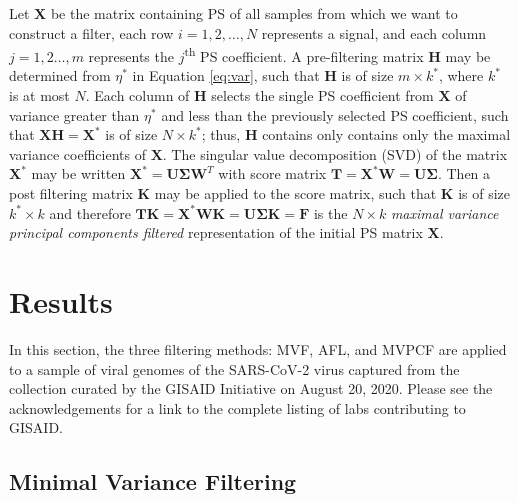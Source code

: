 \documentclass[10pt,conference]{IEEEtran}
\begin{document}
Let $\pmb{X}$ be the matrix containing PS of all samples from which we want to construct a filter, each row $i=1,2,\dots,N$ represents a signal, and each column $j=1,2\dots,m$ represents the $j$\textsuperscript{th} PS coefficient.  
A pre-filtering matrix $\pmb{H}$ may be determined from $\eta^*$ in Equation \ref{eq:var}, such that $\pmb{H}$ is of size $m \times k^*$, where $k^*$ is at most $N$. Each column of $\pmb{H}$ selects the single PS coefficient from $\pmb{X}$ of variance greater than $\eta^*$ and less than the previously selected PS coefficient, such that $\pmb{X}\pmb{H} = \pmb{X^*}$ is of size $N \times k^*$; thus, $\pmb{H}$ contains only contains only the maximal variance coefficients of $\pmb{X}$.  The singular value decomposition (SVD) of the matrix $\pmb{X^*}$ may be written $\pmb{X^*} = \pmb{U}\pmb{\Sigma}\pmb{W}^T$ with score matrix $\pmb{T} =\pmb{X^*}\pmb{W} = \pmb{U}\pmb{\Sigma}$. Then a post filtering matrix $\pmb{K}$ may 
be applied to the score matrix, such that $\pmb{K}$ is of size $k^* \times k$ and therefore $\pmb{T}\pmb{K} = \pmb{X^*}\pmb{W}\pmb{K} = \pmb{U}\pmb{\Sigma}\pmb{K} = \pmb{F}$ is the $N \times k$ \textit{maximal variance principal components filtered} representation of the initial PS matrix $\pmb{X}$. 

\section{Results} 
\label{sec:res}

\noindent In this section, the three filtering methods: MVF, AFL, and MVPCF are applied to a sample of viral genomes of the SARS-CoV-2 virus captured from the collection curated by the GISAID Initiative \cite{gisaid} on August 20, 2020.  Please see the acknowledgements for a link to the complete listing of labs contributing to GISAID.

\subsection{Minimal Variance Filtering} 
\vspace{-2 em} 
\end{document}
